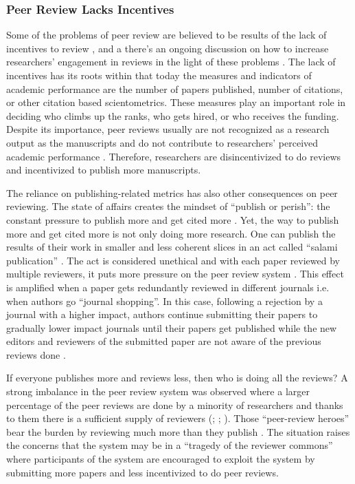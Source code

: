 \subsubsection{Peer Review Lacks Incentives}

Some of the problems of peer review are believed to be results of the lack of incentives to review \parencite{Derraik.2015, Willis.2016}, and a there’s an ongoing discussion on how to increase researchers’ engagement in reviews in the light of these problems \parencite{Derraik.2015, Gasparyan.2015, Hauser.2007, Squazzoni.2013}. The lack of incentives has its roots within that today the measures and indicators of academic performance are the number of papers published, number of citations, or other citation based scientometrics. These measures play an important role in deciding who climbs up the ranks, who gets hired, or who receives the funding. Despite its importance, peer reviews usually are not recognized as a research output as the manuscripts and do not contribute to researchers’ perceived academic performance \parencite{Tennant.2017}. Therefore, researchers are disincentivized to do reviews and incentivized to publish more manuscripts.

The reliance on publishing-related metrics has also other consequences on peer reviewing. The state of affairs creates the mindset of “publish or perish”: the constant pressure to publish more and get cited more \parencite{Rawat.2014}. Yet, the way to publish more and get cited more is not only doing more research. One can publish the results of their work in smaller and less coherent slices \parencite[4]{Ferreira.2016} in an act called “salami publication” \parencite{SupakSmolcic.2013}. The act is considered unethical \parencite[238]{SupakSmolcic.2013} and with each paper reviewed by multiple reviewers, it puts more pressure on the peer review system \parencite[4]{Ferreira.2016}. This effect is amplified when a paper gets redundantly reviewed in different journals i.e. when authors go “journal shopping”. In this case, following a rejection by a journal with a higher impact, authors continue submitting their papers to gradually lower impact journals until their papers get published while the new editors and reviewers of the submitted paper are not aware of the previous reviews done \parencite[10]{Kovanis.2016}. 

If everyone publishes more and reviews less, then who is doing all the reviews? A strong imbalance in the peer review system was observed where a larger percentage of the peer reviews are done by a minority of researchers and thanks to them there is a sufficient supply of reviewers (\cite{Kovanis.2016}; \cite{Petchey.2014}; \cite[37]{Ware.2008}). Those “peer-review heroes” bear the burden by reviewing much more than they publish \parencite[9]{Kovanis.2016}. The situation raises the concerns that the system may be in a “tragedy of the reviewer commons” \parencite{Hochberg.2009} where participants of the system are encouraged to exploit the system by submitting more papers and less incentivized to do peer reviews. 

